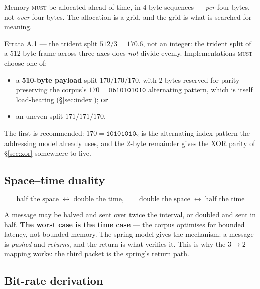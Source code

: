 \documentclass[11pt,a4paper]{article}
\newcommand{\MUST}{\textsc{must}}
\begin{document}
Memory \MUST{} be allocated ahead of time, in 4-byte sequences --- \emph{per}
four bytes, not \emph{over} four bytes. The allocation is a grid, and the grid
is what is searched for meaning.

\begin{errata}{Errata A.1 --- the trident split}
$512/3 = 170.\overline{6}$, not an integer: the trident split of a 512-byte
frame across three axes does \emph{not} divide evenly. Implementations \MUST{}
choose one of:
\begin{itemize}[leftmargin=*,noitemsep]
  \item a \textbf{510-byte payload} split $170/170/170$, with 2 bytes reserved
    for parity --- preserving the corpus's $170 = \texttt{0b10101010}$
    alternating pattern, which is itself load-bearing (\S\ref{sec:index});
    \textbf{or}
  \item an uneven split $171/171/170$.
\end{itemize}
The first is recommended: $170 = \texttt{10101010}_2$ is the alternating index
pattern the addressing model already uses, and the 2-byte remainder gives the
XOR parity of \S\ref{sec:xor} somewhere to live.
\end{errata}

\subsection{Space--time duality}
\label{sec:duality}

\[
\text{half the space} \;\longleftrightarrow\; \text{double the time},
\qquad
\text{double the space} \;\longleftrightarrow\; \text{half the time}
\]

A message may be halved and sent over twice the interval, or doubled and sent in
half. \textbf{The worst case is the time case} --- the corpus optimises for
bounded latency, not bounded memory. The spring model gives the mechanism: a
message is \emph{pushed} and \emph{returns}, and the return is what verifies it.
This is why the $3\rightarrow2$ mapping works: the third packet is the spring's
return path.

\subsection{Bit-rate derivation}
\end{document}
